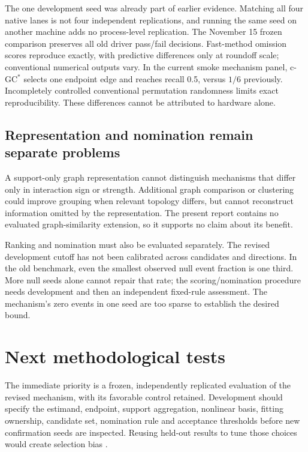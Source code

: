 \documentclass[11pt,a4paper]{article}
\newcommand{\cgcs}{c-GC$^{*}$}
\begin{document}
The one development seed was already part of earlier evidence. Matching all four
native lanes is not four independent replications, and running the same seed on
another machine adds no process-level replication. The November 15 frozen
comparison preserves all old driver pass/fail decisions. Fast-method omission
scores reproduce exactly, with predictive differences only at roundoff scale;
conventional numerical outputs vary. In the current smoke mechanism panel,
\cgcs{} selects one endpoint edge and reaches recall 0.5, versus $1/6$ previously.
Incompletely controlled conventional permutation randomness limits exact
reproducibility. These differences cannot be attributed to hardware alone.

\subsection{Representation and nomination remain separate problems}

A support-only graph representation cannot distinguish mechanisms that differ
only in interaction sign or strength. Additional graph comparison or clustering
could improve grouping when relevant topology differs, but cannot reconstruct
information omitted by the representation. The present report contains no
evaluated graph-similarity extension, so it supports no claim about its benefit.

Ranking and nomination must also be evaluated separately. The revised development
cutoff has not been calibrated across candidates and directions. In the old
benchmark, even the smallest observed null event fraction is one third. More null
seeds alone cannot repair that rate; the scoring/nomination procedure needs
development and then an independent fixed-rule assessment. The mechanism's zero
events in one seed are too sparse to establish the desired bound.

\section{Next methodological tests}
\label{sec:next}

The immediate priority is a frozen, independently replicated evaluation of the
revised mechanism, with its favorable control retained. Development should specify
the estimand, endpoint, support aggregation, nonlinear basis, fitting ownership,
candidate set, nomination rule and acceptance thresholds before new confirmation
seeds are inspected. Reusing held-out results to tune those choices would create
selection bias \citep{cawley2010overfitting}.
\end{document}
